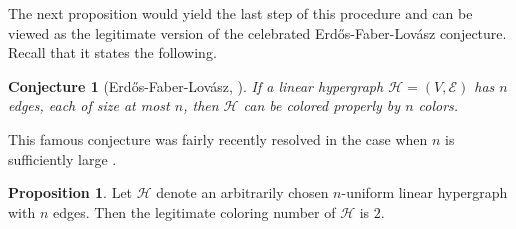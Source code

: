 \documentclass[10pt]{article}
\newcommand{\HH}{\mathcal{H}}
\newtheorem{conj}[thm]{Conjecture}
\theoremstyle{definition}
\newtheorem{proposition}[thm]{Proposition}
\begin{document}
	
	The next {proposition} would yield the last step of this procedure and  can be viewed as the legitimate version of the celebrated Erdős-Faber-Lovász conjecture. Recall that it states the following.
	
	\begin{conj}[Erdős-Faber-Lovász, \cite{erdos}]
		If a linear hypergraph $\HH=(V,   \mathcal{E})$ has $n$ edges, each of size at most $n$, then $\HH$ can be colored properly by $n$ colors.    
	\end{conj}
	
	This famous conjecture was fairly recently resolved in the case when $n$ is sufficiently large \cite{Kang}.
	
	\begin{proposition}
		Let $\mathcal{H}$ denote an arbitrarily chosen $n$-uniform linear hypergraph with $n$ edges.  Then the legitimate coloring number of  $\mathcal{H}$ is $2$.
	\end{proposition} 
	
\end{document}
